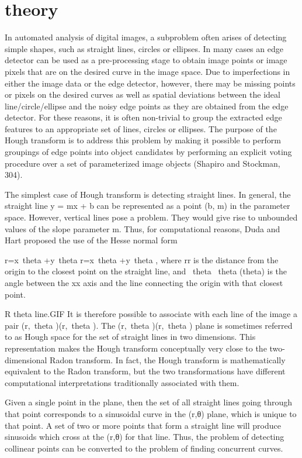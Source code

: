 \documentclass[12pt]{report}	%
\begin{document}
\section{theory}
In automated analysis of digital images, a subproblem often arises of detecting simple shapes, such as straight lines, circles or ellipses. In many cases an edge detector can be used as a pre-processing stage to obtain image points or image pixels that are on the desired curve in the image space. Due to imperfections in either the image data or the edge detector, however, there may be missing points or pixels on the desired curves as well as spatial deviations between the ideal line/circle/ellipse and the noisy edge points as they are obtained from the edge detector. For these reasons, it is often non-trivial to group the extracted edge features to an appropriate set of lines, circles or ellipses. The purpose of the Hough transform is to address this problem by making it possible to perform groupings of edge points into object candidates by performing an explicit voting procedure over a set of parameterized image objects (Shapiro and Stockman, 304).

The simplest case of Hough transform is detecting straight lines. In general, the straight line y = mx + b can be represented as a point (b, m) in the parameter space. However, vertical lines pose a problem. They would give rise to unbounded values of the slope parameter m. Thus, for computational reasons, Duda and Hart proposed the use of the Hesse normal form

{\displaystyle r=x\cos \ theta +y\sin \ theta }{\displaystyle r=x\cos \ theta +y\sin \ theta } ,
where {\displaystyle r}r is the distance from the origin to the closest point on the straight line, and {\displaystyle \ theta }\ theta  (theta) is the angle between the {\displaystyle x}x axis and the line connecting the origin with that closest point.

R theta line.GIF
It is therefore possible to associate with each line of the image a pair {\displaystyle (r,\ theta )}(r,\ theta ). The {\displaystyle (r,\ theta )}(r,\ theta ) plane is sometimes referred to as Hough space for the set of straight lines in two dimensions. This representation makes the Hough transform conceptually very close to the two-dimensional Radon transform. In fact, the Hough transform is mathematically equivalent to the Radon transform, but the two transformations have different computational interpretations traditionally associated with them.

Given a single point in the plane, then the set of all straight lines going through that point corresponds to a sinusoidal curve in the (r,θ) plane, which is unique to that point. A set of two or more points that form a straight line will produce sinusoids which cross at the (r,θ) for that line. Thus, the problem of detecting collinear points can be converted to the problem of finding concurrent curves.
\end{document}
